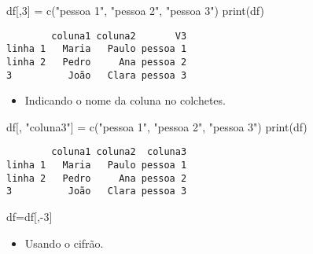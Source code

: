 \documentclass[
  letterpaper,
  DIV=11,
  numbers=noendperiod]{scrreprt}
\newenvironment{Shaded}{\begin{snugshade}}{\end{snugshade}}
\newcommand{\DecValTok}[1]{\textcolor[rgb]{0.68,0.00,0.00}{#1}}
\newcommand{\FunctionTok}[1]{\textcolor[rgb]{0.28,0.35,0.67}{#1}}
\newcommand{\NormalTok}[1]{\textcolor[rgb]{0.00,0.23,0.31}{#1}}
\newcommand{\OtherTok}[1]{\textcolor[rgb]{0.00,0.23,0.31}{#1}}
\newcommand{\SpecialCharTok}[1]{\textcolor[rgb]{0.37,0.37,0.37}{#1}}
\newcommand{\StringTok}[1]{\textcolor[rgb]{0.13,0.47,0.30}{#1}}
\providecommand{\tightlist}{%
  \setlength{\itemsep}{0pt}\setlength{\parskip}{0pt}}\usepackage{longtable,booktabs,array}
\begin{document}
\begin{Shaded}
\begin{Highlighting}[]
\NormalTok{df[,}\DecValTok{3}\NormalTok{] }\OtherTok{=} \FunctionTok{c}\NormalTok{(}\StringTok{"pessoa 1"}\NormalTok{, }\StringTok{"pessoa 2"}\NormalTok{, }\StringTok{"pessoa 3"}\NormalTok{)}
\FunctionTok{print}\NormalTok{(df)}
\end{Highlighting}
\end{Shaded}

\begin{verbatim}
        coluna1 coluna2       V3
linha 1   Maria   Paulo pessoa 1
linha 2   Pedro     Ana pessoa 2
3          João   Clara pessoa 3
\end{verbatim}

\begin{itemize}
\tightlist
\item
  Indicando o nome da coluna no colchetes.
\end{itemize}

\begin{Shaded}
\begin{Highlighting}[]
\NormalTok{df[, }\StringTok{"coluna3"}\NormalTok{] }\OtherTok{=} \FunctionTok{c}\NormalTok{(}\StringTok{"pessoa 1"}\NormalTok{, }\StringTok{"pessoa 2"}\NormalTok{, }\StringTok{"pessoa 3"}\NormalTok{)}
\FunctionTok{print}\NormalTok{(df)}
\end{Highlighting}
\end{Shaded}

\begin{verbatim}
        coluna1 coluna2  coluna3
linha 1   Maria   Paulo pessoa 1
linha 2   Pedro     Ana pessoa 2
3          João   Clara pessoa 3
\end{verbatim}

\begin{Shaded}
\begin{Highlighting}[]
\NormalTok{df}\OtherTok{=}\NormalTok{df[,}\SpecialCharTok{{-}}\DecValTok{3}\NormalTok{]}
\end{Highlighting}
\end{Shaded}

\begin{itemize}
\tightlist
\item
  Usando o cifrão.
\end{itemize}

\begin{Shaded}
\end{Shaded}
\end{document}
